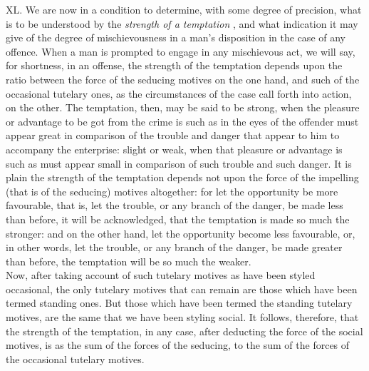 \documentclass[12pt]{report}
\begin{document}
XL. We are now in a condition to determine, with some degree of
precision, what is to be understood by the \emph{strength of a
temptation} , and what indication it may give of the degree of
mischievousness in a man's disposition in the case of any offence. When
a man is prompted to engage in any mischievous act, we will say, for
shortness, in an offense, the strength of the temptation depends upon
the ratio between the force of the seducing motives on the one hand, and
such of the occasional tutelary ones, as the circumstances of the case
call forth into action, on the other. The temptation, then, may be said
to be strong, when the pleasure or advantage to be got from the crime is
such as in the eyes of the offender must appear great in comparison of
the trouble and danger that appear to him to accompany the enterprise:
slight or weak, when that pleasure or advantage is such as must appear
small in comparison of such trouble and such danger. It is plain the
strength of the temptation depends not upon the force of the impelling
(that is of the seducing) motives altogether: for let the opportunity be
more favourable, that is, let the trouble, or any branch of the danger,
be made less than before, it will be acknowledged, that the temptation
is made so much the stronger: and on the other hand, let the opportunity
become less favourable, or, in other words, let the trouble, or any
branch of the danger, be made greater than before, the temptation will
be so much the weaker.\\
Now, after taking account of such tutelary motives as have been styled
occasional, the only tutelary motives that can remain are those which
have been termed standing ones. But those which have been termed the
standing tutelary motives, are the same that we have been styling
social. It follows, therefore, that the strength of the temptation, in
any case, after deducting the force of the social motives, is as the sum
of the forces of the seducing, to the sum of the forces of the
occasional tutelary motives.
\end{document}
